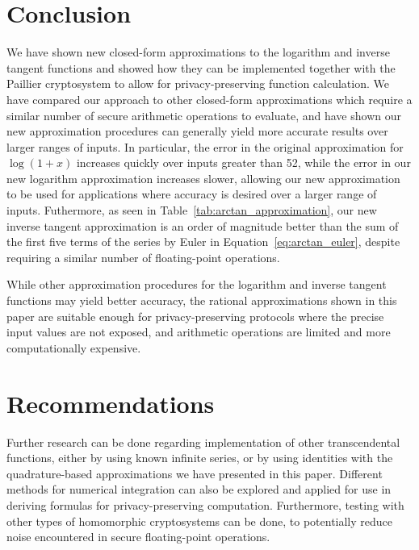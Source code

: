 \section{Conclusion}
We have shown new closed-form approximations to the logarithm and inverse tangent functions and showed how they can be implemented together with the Paillier cryptosystem to allow for privacy-preserving function calculation. We have compared our approach to other closed-form approximations which require a similar number of secure arithmetic operations to evaluate, and have shown our new approximation procedures can generally yield more accurate results over larger ranges of inputs. In particular, the error in the original approximation for $\log{\left(1+x\right)}$ increases quickly over inputs greater than 52, while the error in our new logarithm approximation increases slower, allowing our new approximation to be used for applications where accuracy is desired over a larger range of inputs.
Futhermore, as seen in Table~\ref{tab:arctan_approximation}, our new inverse tangent approximation is an order of magnitude better than the sum of the first five terms of the series by Euler in Equation~\ref{eq:arctan_euler}, despite requiring a similar number of floating-point operations.

While other approximation procedures for the logarithm and inverse tangent functions may yield better accuracy, the rational approximations shown in this paper are suitable enough for privacy-preserving protocols where the precise input values are not exposed, and arithmetic operations are limited and more computationally expensive.

\section{Recommendations}
Further research can be done regarding implementation of other transcendental functions, either by using known infinite series, or by using identities with the quadrature-based approximations we have presented in this paper. Different methods for numerical integration can also be explored and applied for use in deriving formulas for privacy-preserving computation. Furthermore, testing with other types of homomorphic cryptosystems can be done, to potentially reduce noise encountered in secure floating-point operations.
